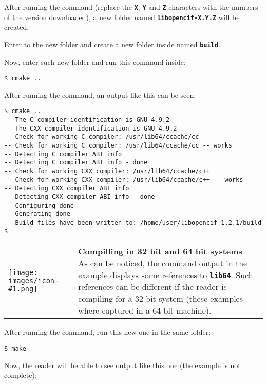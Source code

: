 \documentclass[11pt,twoside,openany,x11names,svgnames]{memoir}
\makeatletter
\newcommand{\IconNote}[3]
{
	\begin{table}[ht]
	\begin{tabular}{ lm{\dimexpr\textwidth-8\tabcolsep-\wd0}@{}}
		\toprule
		\texttt{[image: images/icon-\#1.png]}
		&
		\parbox[t]{155mm}{
		\textbf{#2} \\
		#3
		}
	\end{tabular}
\end{table}
}
\makeatother
\begin{document}
After running the command (replace the \textbf{\texttt{X}}, \textbf{\texttt{Y}} and \textbf{\texttt{Z}} characters with the numbers of the version downloaded), a new folder named \textbf{\texttt{libopencif-X.Y.Z}} will be created.

Enter to the new folder and create a new folder inside named \textbf{\texttt{build}}.

Now, enter such new folder and run this command inside:

\begin{lstlisting}[frame=single,style=SystemCommandStyle]
$ cmake ..
\end{lstlisting}

After running the command, an output like this can be seen:

\begin{lstlisting}[frame=single,style=SystemCommandStyle]
$ cmake ..
-- The C compiler identification is GNU 4.9.2
-- The CXX compiler identification is GNU 4.9.2
-- Check for working C compiler: /usr/lib64/ccache/cc
-- Check for working C compiler: /usr/lib64/ccache/cc -- works
-- Detecting C compiler ABI info
-- Detecting C compiler ABI info - done
-- Check for working CXX compiler: /usr/lib64/ccache/c++
-- Check for working CXX compiler: /usr/lib64/ccache/c++ -- works
-- Detecting CXX compiler ABI info
-- Detecting CXX compiler ABI info - done
-- Configuring done
-- Generating done
-- Build files have been written to: /home/user/libopencif-1.2.1/build
$
\end{lstlisting}

\IconNote
	{info}
	{Compilling in 32 bit and 64 bit systems}
	{As can be noticed, the command output in the example displays some references to \textbf{\texttt{lib64}}. Such references can be different if the reader is compiling for a 32 bit system (these examples where captured in a 64 bit machine).}

After running the command, run this new one in the same folder:

\begin{lstlisting}[frame=single,style=SystemCommandStyle]
$ make
\end{lstlisting}

Now, the reader will be able to see output like this one (the example is not complete):
\end{document}
